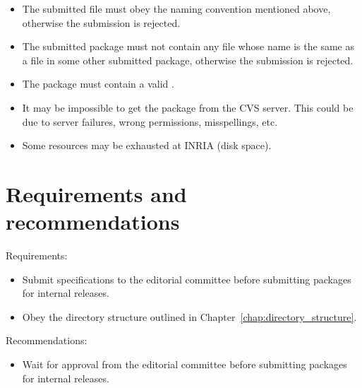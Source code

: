 {\begin{itemize}
\item The submitted file must obey the naming convention mentioned above, 
      otherwise the submission is rejected. 

\item The submitted package must not contain any file whose name is the same
      as a file in some other submitted package, otherwise the submission is 
      rejected. 

\item The package must contain a valid .

\item It may be impossible to get the package from the CVS server. 
      This could be due to server failures, wrong permissions, misspellings,
      etc.

\item Some resources may be exhausted at INRIA (disk space).

\end{itemize}


\section{Requirements and recommendations}
\label{sec:submission_req_and_rec}

\noindent
Requirements:
\begin{itemize}
   \item Submit specifications to the editorial committee before submitting
         packages for internal releases.
   \item Obey the directory structure outlined in Chapter~\ref{chap:directory_structure}.
\end{itemize}

\noindent
Recommendations:
\begin{itemize}
    \item Wait for approval from the editorial committee before submitting packages
          for internal releases.
\end{itemize}
}

